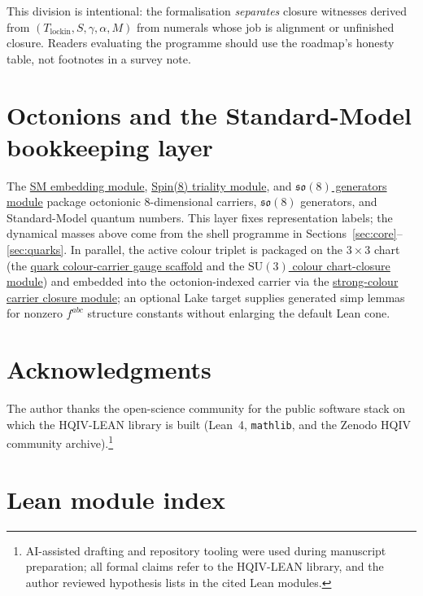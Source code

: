 \documentclass[11pt]{article}
\begin{document}
\noindent This division is intentional: the formalisation
\emph{separates} closure witnesses derived from
$(T_{\mathrm{lockin}},S,\gamma,\alpha,M)$ from numerals whose
job is alignment or unfinished closure. Readers evaluating the
programme should use the roadmap's honesty table, not footnotes
in a survey note.

\section{Octonions and the Standard-Model bookkeeping layer}
\label{sec:octonion-bookkeeping}

The
\hyperref[lean:sm-embedding]{SM embedding module},
\hyperref[lean:triality-cycle]{Spin(8) triality module}, and
\hyperref[lean:so8-generators]{$\mathfrak{so}(8)$ generators
module} package octonionic $8$-dimensional carriers,
$\mathfrak{so}(8)$ generators, and Standard-Model quantum
numbers. This layer fixes representation labels; the dynamical
masses above come from the shell programme in
Sections~\ref{sec:core}--\ref{sec:quarks}. In parallel, the
active colour triplet is packaged on the $3\times 3$ chart (the
\hyperref[lean:color-chart]{quark colour-carrier gauge
scaffold} and the
\hyperref[lean:su3-chart-closure]{$\mathrm{SU}(3)$ colour
chart-closure module}) and embedded into the octonion-indexed
carrier via the
\hyperref[lean:color-carrier-closure]{strong-colour carrier
closure module}; an optional Lake target supplies generated
simp lemmas for nonzero $f^{abc}$ structure constants without
enlarging the default Lean cone.

\section*{Acknowledgments}
The author thanks the open-science community for the public
software stack on which the HQIV-LEAN library is built (Lean~4,
\texttt{mathlib}, and the Zenodo HQIV community
archive).\footnote{AI-assisted drafting and repository tooling
were used during manuscript preparation; all formal claims
refer to the HQIV-LEAN library, and the author reviewed
hypothesis lists in the cited Lean modules.}

\appendix

\section{Lean module index}
\label{app:lean-index}
\end{document}
